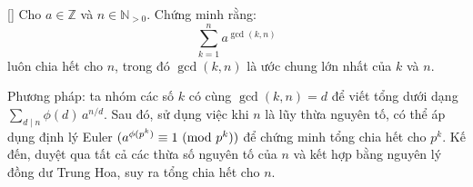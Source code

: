 \documentclass[../03-arithmetic-functions.tex]{subfiles}
\begin{document}
\begin{example*}\label{example:ROU-2015-TST-D2-P1}[\textbf{}]
    Cho \( a \in \mathbb{Z} \) và \( n \in \mathbb{N}_{>0} \). Chứng minh rằng:
    \[
        \sum_{k=1}^{n} a^{\gcd(k,n)}
    \]
    luôn chia hết cho \( n \), trong đó \( \gcd(k,n) \) là ước chung lớn nhất của \( k \) và \( n \).
\end{example*}

\begin{story*}
    Phương pháp: ta nhóm các số \(k\) có cùng \(\gcd(k,n)=d\) để viết tổng dưới dạng \(\sum_{d\mid n}\phi(d)\,a^{n/d}\).
    Sau đó, sử dụng việc khi \(n\) là lũy thừa nguyên tố, có thể áp dụng định lý Euler \((a^{\phi(p^k)} \equiv 1\ (\mathrm{mod}\ p^k))\) để chứng minh tổng chia hết cho \(p^k\).
    Kế đến, duyệt qua tất cả các thừa số nguyên tố của \(n\) và kết hợp bằng nguyên lý đồng dư Trung Hoa, suy ra tổng chia hết cho \(n\).
\end{story*}

\bigbreak
\end{document}
